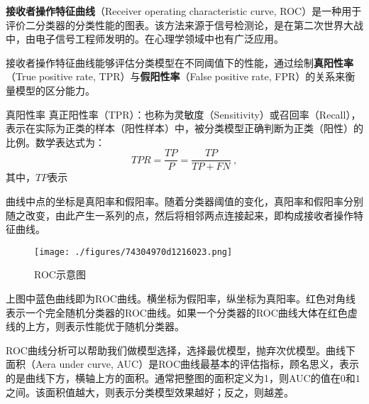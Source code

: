 

\textbf{接收者操作特征曲线}（Receiver operating characteristic curve, ROC）是一种用于评价二分类器的分类性能的图表。该方法来源于信号检测论，是在第二次世界大战中，由电子信号工程师发明的。在心理学领域中也有广泛应用。

接收者操作特征曲线能够评估分类模型在不同阈值下的性能，通过绘制\textbf{真阳性率}（True positive rate, TPR）与\textbf{假阳性率}（False positive rate, FPR）的关系来衡量模型的区分能力。

\begin{definition}{真阳性率}
真正阳性率（TPR）：也称为灵敏度（Sensitivity）或召回率（Recall），表示在实际为正类的样本（阳性样本）中，被分类模型正确判断为正类（阳性）的比例。数学表达式为：
\begin{equation}
TPR=\frac{TP}{P}=\frac{TP}{TP+FN}~,
\end{equation}
其中，$TP$表示
\end{definition}

曲线中点的坐标是真阳率和假阳率。随着分类器阈值的变化，真阳率和假阳率分别随之改变，由此产生一系列的点，然后将相邻两点连接起来，即构成接收者操作特征曲线。

\begin{figure}[ht]
\centering
\texttt{[image: ./figures/74304970d1216023.png]}
\caption{ROC示意图} \label{fig_ROC_1}
\end{figure}
上图中蓝色曲线即为ROC曲线。横坐标为假阳率，纵坐标为真阳率。红色对角线表示一个完全随机分类器的ROC曲线。如果一个分类器的ROC曲线大体在红色虚线的上方，则表示性能优于随机分类器。

ROC曲线分析可以帮助我们做模型选择，选择最优模型，抛弃次优模型。曲线下面积（Aera under curve, AUC）是ROC曲线最基本的评估指标，顾名思义，表示的是曲线下方，横轴上方的面积。通常把整图的面积定义为1，则AUC的值在$0$和$1$之间。该面积值越大，则表示分类模型效果越好；反之，则越差。
